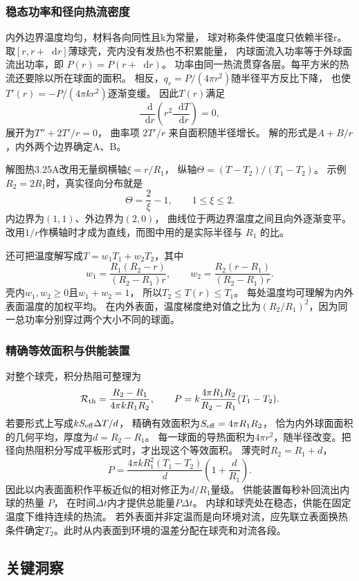 \documentclass[UTF8,fontset=fandol,a4paper,11pt]{ctexart}
\newcommand{\dd}{\mathop{}\!\mathrm{d}}
\begin{document}
\subsubsection*{稳态功率和径向热流密度}
内外边界温度均匀，材料各向同性且k为常量，
球对称条件使温度只依赖半径r。
取$[r,r+\dd r]$薄球壳，壳内没有发热也不积累能量，
内球面流入功率等于外球面流出功率，即 $P(r)=P(r+\dd r)$。
功率由同一热流贯穿各层。每平方米的热流还要除以所在球面的面积。
相反，$q_r=P/(4\pi r^2)$随半径平方反比下降，
也使$T'(r)=-P/(4\pi kr^2)$逐渐变缓。
因此$T(r)$满足
\[
\frac{\dd}{\dd r}\left(r^2\frac{\dd T}{\dd r}\right)=0,
\]
展开为$T''+2T'/r=0$，
曲率项 $2T'/r$ 来自面积随半径增长。
解的形式是$A+B/r$，内外两个边界确定A、B。

解图热3.25A改用无量纲横轴$\xi=r/R_1$，
纵轴$\Theta=(T-T_2)/(T_1-T_2)$。
示例$R_2=2R_1$时，真实径向分布就是
\[
\Theta=\frac2\xi-1,\qquad1\le\xi\le2.
\]
内边界为$(1,1)$、外边界为$(2,0)$，
曲线位于两边界温度之间且向外逐渐变平。
改用$1/r$作横轴时才成为直线，而图中用的是实际半径与 $R_1$ 的比。

还可把温度解写成$T=w_1T_1+w_2T_2$，其中
\[
w_1=\frac{R_1(R_2-r)}{(R_2-R_1)r},\qquad
w_2=\frac{R_2(r-R_1)}{(R_2-R_1)r}.
\]
壳内$w_1,w_2\ge0$且$w_1+w_2=1$，
所以$T_2\le T(r)\le T_1$。
每处温度均可理解为内外表面温度的加权平均。
在内外表面，温度梯度绝对值之比为$(R_2/R_1)^2$，因为同一总功率分别穿过两个大小不同的球面。

\subsubsection*{精确等效面积与供能装置}
对整个球壳，积分热阻可整理为
\[
\mathcal R_{\rm th}=\frac{R_2-R_1}{4\pi kR_1R_2},\qquad
P=k\frac{4\pi R_1R_2}{R_2-R_1}(T_1-T_2).
\]
若要形式上写成$kS_{\rm eff}\Delta T/d$，
精确有效面积为$S_{\rm eff}=4\pi R_1R_2$，
恰为内外球面面积的几何平均，厚度为$d=R_2-R_1$。
每一球面的导热面积为$4\pi r^2$，随半径改变。把径向热阻积分写成平板形式时，才出现这个等效面积。
薄壳时$R_2=R_1+d$，
\[
P=\frac{4\pi kR_1^2(T_1-T_2)}d
\left(1+\frac d{R_1}\right).
\]
因此以内表面面积作平板近似的相对修正为$d/R_1$量级。
供能装置每秒补回流出内球的热量 $P$，
在时间$\Delta t$内才提供总能量$P\Delta t$。
内球和球壳处在稳态，供能在固定温度下维持连续的热流。
若外表面并非定温而是向环境对流，应先联立表面换热条件确定$T_2$。此时从内表面到环境的温差分配在球壳和对流各段。




\subsection*{关键洞察}
\end{document}
